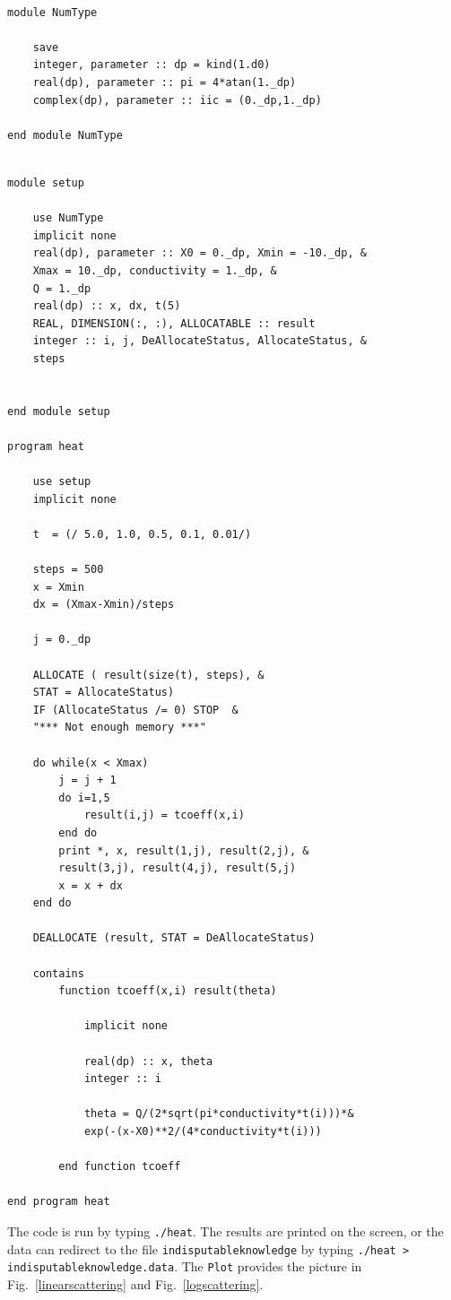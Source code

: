 \documentclass[12pt]{article}
\begin{document}
\begin{lstlisting}[frame=single,caption={Module {\tt NumType}},label=module]

module NumType

	save
	integer, parameter :: dp = kind(1.d0)
	real(dp), parameter :: pi = 4*atan(1._dp)
	complex(dp), parameter :: iic = (0._dp,1._dp)
	
end module NumType

\end{lstlisting}


\begin{lstlisting}[frame=single,caption={{\tt heat.f95}},label=scattering95]

module setup

	use NumType
	implicit none
	real(dp), parameter :: X0 = 0._dp, Xmin = -10._dp, &
	Xmax = 10._dp, conductivity = 1._dp, &
	Q = 1._dp
	real(dp) :: x, dx, t(5)
	REAL, DIMENSION(:, :), ALLOCATABLE :: result
	integer :: i, j, DeAllocateStatus, AllocateStatus, &
	steps
	

end module setup

program heat

	use setup
	implicit none
	
	t  = (/ 5.0, 1.0, 0.5, 0.1, 0.01/) 

	steps = 500
	x = Xmin
	dx = (Xmax-Xmin)/steps

	j = 0._dp		

	ALLOCATE ( result(size(t), steps), & 
	STAT = AllocateStatus)
	IF (AllocateStatus /= 0) STOP  &
	"*** Not enough memory ***"
	
	do while(x < Xmax)
		j = j + 1
		do i=1,5
			result(i,j) = tcoeff(x,i)
		end do
		print *, x, result(1,j), result(2,j), &
		result(3,j), result(4,j), result(5,j)
		x = x + dx
	end do

	DEALLOCATE (result, STAT = DeAllocateStatus)

	contains
		function tcoeff(x,i) result(theta)

			implicit none

			real(dp) :: x, theta
			integer :: i

			theta = Q/(2*sqrt(pi*conductivity*t(i)))*&
			exp(-(x-X0)**2/(4*conductivity*t(i)))

		end function tcoeff
		
end program heat

\end{lstlisting}


The code is run by typing {\tt ./heat}. The results are printed on the screen, or the data can redirect to the file {\tt indisputableknowledge} by typing {\tt ./heat > indisputableknowledge.data}. The {\tt Plot} provides the picture in Fig.\ \ref{linearscattering} and Fig.\ \ref{logscattering}. 
\end{document}
